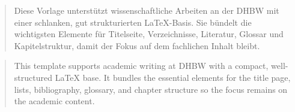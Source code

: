 \renewcommand{\abstractname}{Zusammenfassung}
\begin{abstract}
    \thispagestyle{plain}   %
    Diese Vorlage unterstützt wissenschaftliche Arbeiten an der DHBW mit einer schlanken, gut strukturierten LaTeX-Basis. Sie bündelt die wichtigsten Elemente für Titelseite, Verzeichnisse, Literatur, Glossar und Kapitelstruktur, damit der Fokus auf dem fachlichen Inhalt bleibt.
\end{abstract}

\renewcommand{\abstractname}{Abstract}
\begin{abstract}
    \thispagestyle{plain}   %
    This template supports academic writing at DHBW with a compact, well-structured LaTeX base. It bundles the essential elements for the title page, lists, bibliography, glossary, and chapter structure so the focus remains on the academic content.
\end{abstract}